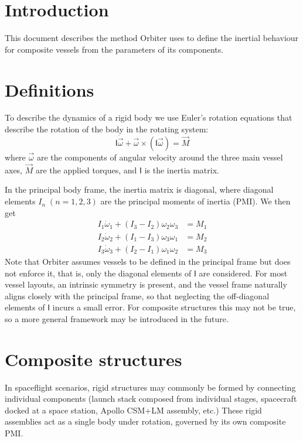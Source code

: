 \documentclass[a4paper]{article}
\newcommand\mat[1]{\mathsf{#1}}
\begin{document}
\maketitle

\section{Introduction}
This document describes the method Orbiter uses to define the inertial behaviour for composite vessels from the parameters of its components.

\section{Definitions}
To describe the dynamics of a rigid body we use Euler's rotation equations that describe the rotation of the body in the rotating system:
\begin{equation}
\mat{I} \dot{\vec{\omega}} + \vec{\omega} \times (\mat{I}\vec{\omega}) = \vec{M}
\end{equation}
where $\vec{\omega}$ are the components of angular velocity around the three main vessel axes, $\vec{M}$ are the applied torques, and $\mat{I}$ is the inertia matrix.

In the principal body frame, the inertia matrix is diagonal, where diagonal elements $I_n\;(n=1,2,3)$ are the principal moments of inertia (PMI). We then get
\begin{equation}
\begin{split}
  I_1 \dot\omega_1 + (I_3 - I_2) \omega_2 \omega_3 &= M_1 \\
  I_2 \dot\omega_2 + (I_1 - I_3) \omega_3 \omega_1 &= M_2 \\
  I_3 \dot\omega_3 + (I_2 - I_1) \omega_1 \omega_2 &= M_3
\end{split}
\end{equation}
Note that Orbiter assumes vessels to be defined in the principal frame but does not enforce it, that is, only the diagonal elements of $\mat{I}$ are considered. For most vessel layouts, an intrinsic symmetry is present, and the vessel frame naturally aligns closely with the principal frame, so that neglecting the off-diagonal elements of $\mat{I}$ incurs a small error. For composite structures this may not be true, so a more general framework may be introduced in the future. 

\section{Composite structures}
In spaceflight scenarios, rigid structures may commonly be formed by connecting individual components (launch stack composed from individual stages, spacecraft docked at a space station, Apollo CSM+LM assembly, etc.) These rigid assemblies act as a single body under rotation, governed by its own composite PMI.
\end{document}
